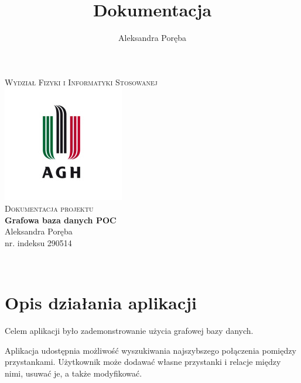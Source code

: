 \documentclass[12pt]{article}
\title{Dokumentacja}
\author{Aleksandra Poręba}
\makeatletter
\let\thetitle\@title
\let\theauthor\@author
\makeatother
\begin{document}
\begin{center}
\textsc{\normalsize Wydział Fizyki i Informatyki Stosowanej}\\[2.0cm] 
\includegraphics[scale = 1]{logo.png}\\[1cm] 
\textsc{\Large Dokumentacja projektu}\\[0.4cm] 

{ \huge \bfseries \LARGE{Grafowa baza danych POC} }\\[1cm] 

\flushright \Large Aleksandra Poręba \\ nr. indeksu 290514

\vfill 

\center {\today}\\[2cm] 

\pagebreak 

\end{center}

\tableofcontents
\pagebreak


\pagestyle{fancy}
\fancyhf{}

\rhead{\theauthor}
\lhead{\thetitle}
\cfoot{\thepage}

\section{Opis działania aplikacji}
Celem aplikacji było zademonstrowanie użycia grafowej bazy danych.

Aplikacja udostępnia możliwość wyszukiwania najszybszego połączenia pomiędzy przystankami. Użytkownik może dodawać własne przystanki i relacje między nimi, usuwać je, a także modyfikować.
\end{document}
